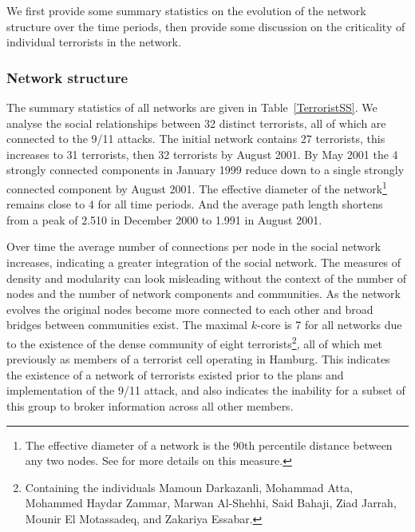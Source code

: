 We first provide some summary statistics on the evolution of the network structure over the time periods, then provide some discussion on the criticality of individual terrorists in the network.

\subsubsection*{Network structure}

The summary statistics of all networks are given in Table~\ref{TerroristSS}. We analyse the social relationships between 32 distinct terrorists, all of which are connected to the 9/11 attacks. The initial network contains 27 terrorists, this increases to 31 terrorists, then 32 terrorists by August 2001. By May 2001 the 4 strongly connected components in January 1999 reduce down to a single strongly connected component by August 2001. The effective diameter of the network\footnote{The effective diameter of a network is the 90th percentile distance between any two nodes. See \citet{Leskovec2005a} for more details on this measure.} remains close to 4 for all time periods. And the average path length shortens from a peak of 2.510 in December 2000 to 1.991 in August 2001.

Over time the average number of connections per node in the social network increases, indicating a greater integration of the social network. The measures of density and modularity can look misleading without the context of the number of nodes and the number of network components and communities. As the network evolves the original nodes become more connected to each other and broad bridges between communities exist. The maximal $k$-core is 7 for all networks due to the existence of the dense community of eight terrorists\footnote{Containing the individuals Mamoun Darkazanli, Mohammad Atta, Mohammed Haydar Zammar, Marwan Al-Shehhi, Said Bahaji, Ziad Jarrah, Mounir El Motassadeq, and Zakariya Essabar.}, all of which met previously as members of a terrorist cell operating in Hamburg. This indicates the existence of a network of terrorists existed prior to the plans and implementation of the 9/11 attack, and also indicates the inability for a subset of this group to broker information across all other members.

